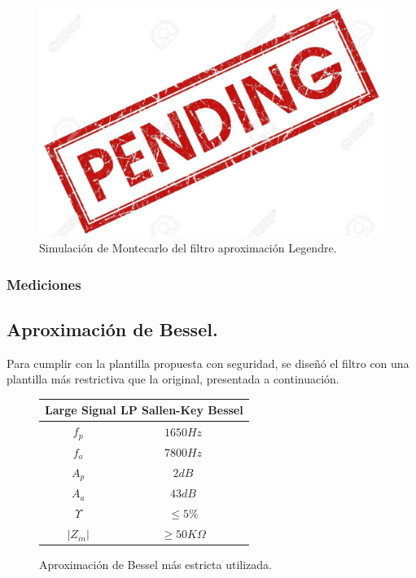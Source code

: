 \begin{figure}[H]
\centering
	\centering
	\includegraphics[width=\textwidth]{Imagenes-Ej1/pend.jpg}
	\caption{Simulación de Montecarlo del filtro aproximación Legendre.}
	\label{leg_mont_sim}
\end{figure}

\subsubsection{Mediciones}


\subsection{Aproximación de Bessel.}

Para cumplir con la plantilla propuesta con seguridad, se diseñó el filtro con una plantilla más restrictiva que la original, presentada a continuación.
\begin{figure}[H]
		\begin{table}[H]
			\centering
			\begin{tabular}{@{}cc@{}}
			\toprule
			\multicolumn{2}{c}{Large Signal LP Sallen-Key Bessel} \\ \midrule
			$f_p$ & $1650Hz$ \\
			$f_a$ & $7800Hz$ \\
			$A_p$ & $2dB$ \\
			$A_a$ & $43dB$ \\
			$\Upsilon$ & $\leq 5\%$ \\
			$\left| Z_{in}\right|$ & $\geq 50K\Omega$ \\ \bottomrule
			\end{tabular}
		\end{table}
		\caption{Aproximación de Bessel más estricta utilizada.}
		\label{aprox_leg_est}
\end{figure}

